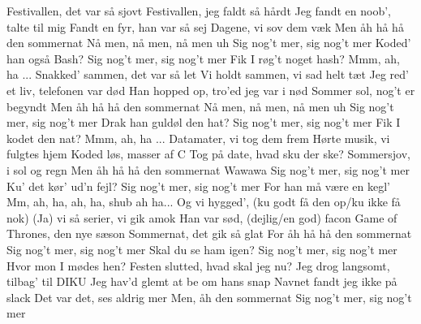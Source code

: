 \documentclass[a4paper,11pt]{article}
\begin{document}
\begin{song}
   Festivallen, det var så sjovt
   Festivallen, jeg faldt så hårdt
   Jeg fandt en noob', talte til mig
   Fandt en fyr, han var så sej
   Dagene, vi sov dem væk
   Men åh hå hå den sommernat
   Nå men, nå men, nå men uh
   Sig nog't mer, sig nog't mer
   Koded' han også Bash?
   Sig nog't mer, sig nog't mer
   Fik I røg't noget hash?
   Mmm, ah, ha ...
   Snakked' sammen, det var så let
   Vi holdt sammen, vi sad helt tæt
   Jeg red' et liv, telefonen var død
   Han hopped op, tro'ed jeg var i nød
   Sommer sol, nog't er begyndt
   Men åh hå hå den sommernat
   Nå men, nå men, nå men uh
   Sig nog't mer, sig nog't mer
   Drak han guldøl den hat?
   Sig nog't mer, sig nog't mer
   Fik I kodet den nat?
   Mmm, ah, ha ...
   Datamater, vi tog dem frem
   Hørte musik, vi fulgtes hjem
   Koded løs, masser af C
   Tog på date, hvad sku der ske?
   Sommersjov, i sol og regn
   Men åh hå hå den sommernat
   Wawawa
   Sig nog't mer, sig nog't mer
   Ku' det kør' ud'n fejl?
   Sig nog't mer, sig nog't mer
   For han må være en kegl'
   Mm, ah, ha, ah, ha, shub ah ha...
   Og vi hygged', (ku godt få den op/ku ikke få nok)
   (Ja) vi så serier, vi gik amok
   Han var sød, (dejlig/en god) facon
   Game of Thrones, den nye sæson
   Sommernat, det gik så glat
   For åh hå hå den sommernat
   Sig nog't mer, sig nog't mer
   Skal du se ham igen?
   Sig nog't mer, sig nog't mer
   Hvor mon I mødes hen?
   Festen slutted, hvad skal jeg nu?
   Jeg drog langsomt, tilbag' til DIKU
   Jeg hav'd glemt at be om hans snap
   Navnet fandt jeg ikke på slack
   Det var det, ses aldrig mer
   Men, åh den sommernat
   Sig nog't mer, sig nog't mer
\end{song}
\end{document}
